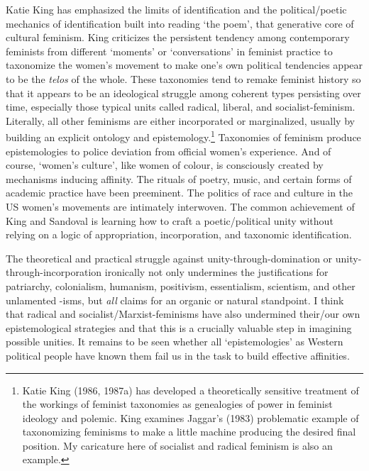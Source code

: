 \documentclass[DIV=12,%
               BCOR=10mm,%
               headinclude=false,%
               footinclude=false,open=any,%
               fontsize=11pt,%
               twoside,%
               paper=210mm:11in]%
               {scrbook}
\newcommand*{\Slash}{\slash\hspace{0pt}}
\begin{document}
Katie King has emphasized the limits of identification and the political\Slash{}poetic mechanics of identification built into reading ‘the poem’, that generative core of cultural feminism. King criticizes the persistent tendency among contemporary feminists from different ‘moments’ or ‘conversations’ in feminist practice to taxonomize the women’s movement to make one’s own political tendencies appear to be the \emph{telos} of the whole. These taxonomies tend to remake feminist history so that it appears to be an ideological struggle among coherent types persisting over time, especially those typical units called radical, liberal, and socialist-feminism. Literally, all other feminisms are either incorporated or marginalized, usually by building an explicit ontology and epistemology.\footnote{Katie King (1986, 1987a) has developed a theoretically sensitive treatment of the workings of feminist taxonomies as genealogies of power in feminist ideology and polemic. King examines Jaggar’s (1983) problematic example of taxonomizing feminisms to make a little machine producing the desired final position. My caricature here of socialist and radical feminism is also an example.} Taxonomies of feminism produce epistemologies to police deviation from official women’s experience. And of course, ‘women’s culture’, like women of colour, is consciously created by mechanisms inducing affinity. The rituals of poetry, music, and certain forms of academic practice have been preeminent. The politics of race and culture in the US women’s movements are intimately interwoven. The common achievement of King and Sandoval is learning how to craft a poetic\Slash{}political unity without relying on a logic of appropriation, incorporation, and taxonomic identification.


The theoretical and practical struggle against unity-through-domination or unity-through-incorporation ironically not only undermines the justifications for patriarchy, colonialism, humanism, positivism, essentialism, scientism, and other unlamented -isms, but \emph{all} claims for an organic or natural standpoint. I think that radical and socialist\Slash{}Marxist-feminisms have also undermined their\Slash{}our own epistemological strategies and that this is a crucially valuable step in imagining possible unities. It remains to be seen whether all ‘epistemologies’ as Western political people have known them fail us in the task to build effective affinities.
\end{document}
